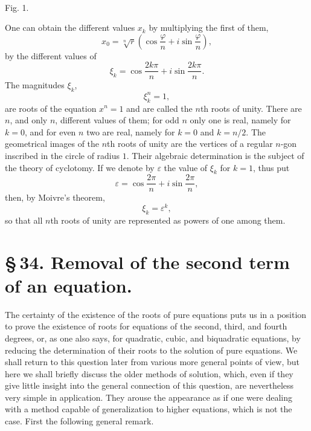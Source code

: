 \documentclass[11pt]{article}
\begin{document}
\begin{center}
\\[-0.2em]
{\small Fig. 1.}
\end{center}


One can obtain the different values $x_k$ by multiplying the first of them,
\[
 x_0=\sqrt[n]{r}\left(\cos\frac{\varphi}{n}+i\sin\frac{\varphi}{n}\right),
\]
by the different values of
\begin{equation}
 \xi_k=\cos\frac{2k\pi}{n}+i\sin\frac{2k\pi}{n}.
\tag{11}
\end{equation}
The magnitudes $\xi_k$,
\begin{equation}
 \xi_k^n=1,
\tag{12}
\end{equation}
are roots of the equation $x^n=1$ and are called the $n$th roots of unity. There are $n$, and only $n$, different values of them; for odd $n$ only one is real, namely for $k=0$, and for even $n$ two are real, namely for $k=0$ and $k=n/2$. The geometrical images of the $n$th roots of unity are the vertices of a regular $n$-gon inscribed in the circle of radius $1$. Their algebraic determination is the subject of the theory of cyclotomy. If we denote by $\varepsilon$ the value of $\xi_k$ for $k=1$, thus put
\[
 \varepsilon=\cos\frac{2\pi}{n}+i\sin\frac{2\pi}{n},
\]
then, by Moivre's theorem,
\[
 \xi_k=\varepsilon^k,
\]
so that all $n$th roots of unity are represented as powers of one among them.


\section*{\S\,34. Removal of the second term of an equation.}

The certainty of the existence of the roots of pure equations puts us in a position to prove the existence of roots for equations of the second, third, and fourth degrees, or, as one also says, for quadratic, cubic, and biquadratic equations, by reducing the determination of their roots to the solution of pure equations. We shall return to this question later from various more general points of view, but here we shall briefly discuss the older methods of solution, which, even if they give little insight into the general connection of this question, are nevertheless very simple in application. They arouse the appearance as if one were dealing with a method capable of generalization to higher equations, which is not the case. First the following general remark.
\end{document}

